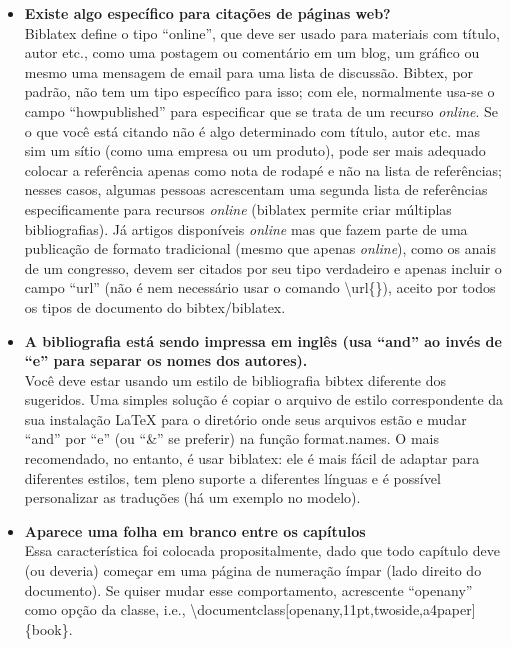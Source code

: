\begin{itemize}
\item \textbf{Existe algo específico para citações de páginas web?}\\
Biblatex define o tipo ``online'', que deve ser usado para materiais com título, autor etc., como uma postagem ou comentário em um blog, um gráfico ou mesmo uma mensagem de email para uma lista de discussão. Bibtex, por padrão, não tem um tipo específico para isso; com ele, normalmente usa-se o campo ``howpublished'' para especificar que se trata de um recurso \textit{online}. Se o que você está citando não é algo determinado com título, autor etc. mas sim um sítio (como uma empresa ou um produto), pode ser mais adequado colocar a referência apenas como nota de rodapé e não na lista de referências; nesses casos, algumas pessoas acrescentam uma segunda lista de referências especificamente para recursos \textit{online} (biblatex permite criar múltiplas bibliografias). Já artigos disponíveis \textit{online} mas que fazem parte de uma publicação de formato tradicional (mesmo que apenas \textit{online}), como os anais de um congresso, devem ser citados por seu tipo verdadeiro e apenas incluir o campo ``url'' (não é nem necessário usar o comando \textsf{\textbackslash{}url\{\}}), aceito por todos os tipos de documento do bibtex/biblatex.

\item \textbf{A bibliografia está sendo impressa em inglês (usa ``and'' ao invés de ``e'' para separar os nomes dos autores).}\\
Você deve estar usando um estilo de bibliografia bibtex diferente dos sugeridos. Uma simples solução é copiar o arquivo de estilo correspondente da sua instalação \LaTeX{} para o diretório onde seus arquivos estão e mudar ``and'' por ``e'' (ou ``\&'' se preferir) na função format.names. O mais recomendado, no entanto, é usar biblatex: ele é mais fácil de adaptar para diferentes estilos, tem pleno suporte a diferentes línguas e é possível personalizar as traduções (há um exemplo no modelo).

\item \textbf{Aparece uma folha em branco entre os capítulos}\\
Essa característica foi colocada propositalmente, dado que todo capítulo deve (ou deveria) começar em uma página de numeração ímpar (lado direito do documento). Se quiser mudar esse comportamento, acrescente ``openany'' como opção da classe, i.e., \textsf{\textbackslash{}documentclass[openany,11pt,twoside,a4paper]\{book\}}.


\end{itemize}
